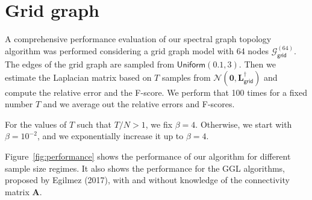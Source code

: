 \documentclass{article}
\begin{document}
\section{Grid graph}
A comprehensive performance evaluation of our spectral graph topology algorithm was
performed considering a grid graph model with 64 nodes $\mathcal{G}^{(64)}_{\mathsf{grid}}$.
The edges of the grid graph are sampled from $\mathsf{Uniform}(0.1, 3)$.
Then we estimate the Laplacian matrix based on $T$ samples from $\mathcal{N}(\mathbf{0}, \mathbf{L}_{\mathsf{grid}}^{\dagger})$
and compute the relative error and the F-score. We perform that 100 times for a fixed number $T$ and we average out the relative errors
and F-scores.

For the values of $T$ such that $T / N > 1$, we fix $\beta = 4$. Otherwise, we start with $\beta = 10^{-2}$, and we exponentially
increase it up to $\beta = 4$.

Figure~\ref{fig:performance} shows the performance of our algorithm for different sample size regimes.
It also shows the performance for the \textsf{GGL} algorithms,  proposed by Egilmez (2017), with and
without knowledge of the connectivity matrix $\mathbf{A}$.
\end{document}
